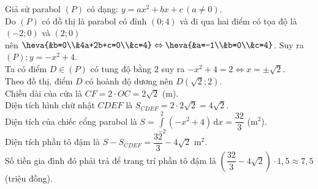 \begin{ex}
{\begin{center}
\begin{tikzpicture}[>=stealth, scale=1]
		\end{tikzpicture}
	\end{center}
	Giả sử parabol $(P)$ có dạng: $y=ax^2+bx+c\,(a\ne0)$.\\
	Do $(P)$ có đồ thị là parabol có đỉnh $(0;4)$ và đi qua hai điểm có tọa độ là $(-2;0)$ và $(2;0)$ \\
	nên $\heva{&b=0\\&4a+2b+c=0\\&c=4}\Leftrightarrow \heva{&a=-1\\&b=0\\&c=4}$.
	Suy ra $(P)\colon y=-x^2+4$.\\
	Ta có điểm $D\in (P)$ có tung độ bằng $2$ suy ra $-x^2+4=2\Leftrightarrow x=\pm\sqrt{2}$.\\
	Theo đồ thị, điểm $D$ có hoành độ dương nên $D(\sqrt{2};2)$.\\
	Chiều dài của cửa là $CF=2\cdot OC=2\sqrt{2}$ (m).\\
	Diện tích hình chữ nhật $CDEF$ là $S_{CDEF}=2\cdot 2\sqrt{2}=4\sqrt{2}$.\\
	Diện tích của chiếc cổng parabol là $S=\displaystyle\int \limits_{-2}^{2}(-x^2+4)\mathrm{\,d}x=\dfrac{32}{3}$ (m$^2$).\\
	Diện tích phần tô đậm là $S-S_{CDEF}=\dfrac{32}{3}-4\sqrt{2}$ m$^2$.\\
	Số tiền gia đình đó phải trả để trang trí phần tô đậm là $\left(\dfrac{32}{3}-4\sqrt{2}\right)\cdot 1{,}5\approx7{,}5$ (triệu đồng).
	
}
\end{ex}

